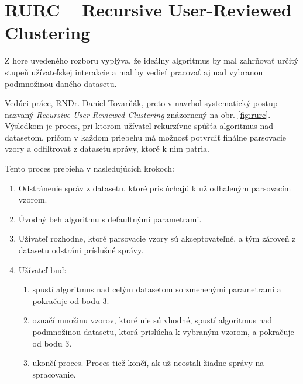 \section{RURC -- Recursive User-Reviewed Clustering}
\label{sec:rurc}
Z hore uvedeného rozboru vyplýva, že ideálny algoritmus by mal zahrňovať určitý stupeň užívateľskej interakcie a mal by vedieť pracovať aj nad vybranou podmnožinou daného datasetu. 
\par Vedúci práce, RNDr. Daniel Tovarňák, preto v \parencite{Tovarnak2017} navrhol systematický postup nazvaný \emph{Recursive User-Reviewed Clustering} znázornený na obr. \ref{fig:rurc}. Výsledkom je proces, pri ktorom užívateľ rekurzívne spúšťa algoritmus nad datasetom, pričom v každom priebehu má možnosť potvrdiť finálne parsovacie vzory a odfiltrovať z datasetu správy, ktoré k nim patria. 
\par Tento proces prebieha v nasledujúcich krokoch:

\begin{enumerate}
  \item Odstránenie správ z datasetu, ktoré prislúchajú k už odhaleným parsovacím vzorom.
  \item Úvodný beh algoritmu s defaultnými parametrami.
  \item Užívateľ rozhodne, ktoré parsovacie vzory sú akceptovateľné, a tým zároveň z datasetu odstráni príslušné správy.
  \item Užívateľ buď:
  	\begin{enumerate}
   		 \item spustí algoritmus nad celým datasetom so zmenenými parametrami a pokračuje od bodu 3.
   		 \item označí množinu vzorov, ktoré nie sú vhodné, spustí algoritmus nad podmnožinou datasetu, ktorá prislúcha k vybraným vzorom, a 				pokračuje od bodu 3.
   		 \item ukončí proces. Proces tiež končí, ak už neostali žiadne správy na spracovanie.
 	 \end{enumerate}
\end{enumerate}

